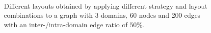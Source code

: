 {\begin{figure}[p]
\begin{adjustwidth}{0cm}{-1cm}
{    }\\
  \end{adjustwidth}  
  \caption[Different layouts for a graph with 3 domains, 60 nodes and 200 edges with a inter-/intra-domain edge ratio of 50\%.]{Different layouts obtained by applying different strategy and layout combinations to a graph with 3 domains, 60 nodes and 200 edges with an inter-/intra-domain edge ratio of 50\%.}%
  \label{fig:ex2}
\end{figure}
  \cleartoodd
}

